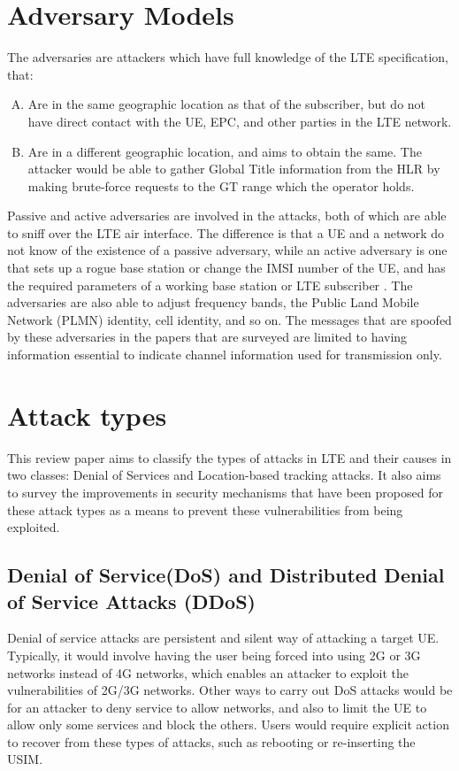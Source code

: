 \documentclass[sigconf,nonacm]{acmart}
\begin{document}
\section{Adversary Models}
The adversaries are attackers which have full knowledge of the LTE specification, that:

\begin{enumerate}[A.]
    \item Are in the same geographic location as that of the subscriber, but do not have direct contact with the UE, EPC, and other parties in the LTE network.
    \item Are in a different geographic location, and aims to obtain the same. The attacker would be able to gather Global Title information from the HLR by making brute-force requests to the GT range which the operator holds.

\end{enumerate}

Passive and active adversaries are involved in the attacks, both of which are able to sniff over the LTE air interface. The difference is that a UE and a network do not know of the existence of a passive adversary, while an active adversary is one that sets up a rogue base station or change the IMSI number of the UE, and has the required parameters of a working base station or LTE subscriber \cite{do}. The adversaries are also able to adjust frequency bands, the Public Land Mobile Network (PLMN) identity, cell identity, and so on. The messages that are spoofed by these adversaries in the papers that are surveyed are limited to having information essential to indicate channel information used for transmission only. 

\section{Attack types}

This review paper aims to classify the types of attacks in LTE and their causes in two classes: Denial of Services and Location-based tracking attacks. It also aims to survey the improvements in security mechanisms that have been proposed for these attack types as a means to prevent these vulnerabilities from being exploited.

\subsection{Denial of Service(DoS) and Distributed Denial of Service Attacks (DDoS)}
Denial of service attacks are persistent and silent way of attacking a target UE. Typically, it would involve having the user being forced into using 2G or 3G networks instead of 4G networks, which enables an attacker to exploit the vulnerabilities of 2G/3G networks. Other ways to carry out DoS attacks would be for an attacker to deny service to allow networks, and also to limit the UE to allow only some services and block the others. Users would require explicit action to recover from these types of attacks, such as rebooting or re-inserting the USIM. 
\end{document}
